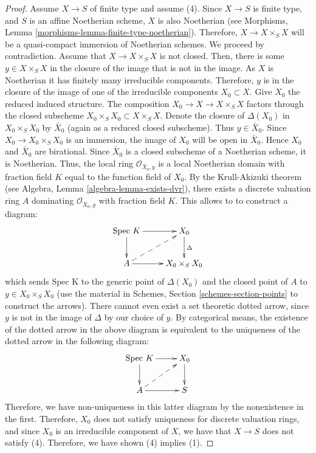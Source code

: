 \begin{proof}
\medskip\noindent
Assume $X \to S$ of finite type and assume (4).
Since $X \to S$ is finite type, and $S$ is an affine Noetherian
scheme, $X$ is also Noetherian (see
Morphisms, Lemma \ref{morphisms-lemma-finite-type-noetherian}).
Therefore, $X \to X \times_S X$ will
be a quasi-compact immersion of Noetherian schemes.  We proceed by
contradiction.  Assume that $X \to X \times_S X$ is not closed.  Then,
there is some $y \in X \times_S X$ in the closure of the image that is
not in the image. As $X$ is Noetherian it has finitely many irreducible
components. Therefore, $y$ is in the closure of the image of one of
the irreducible components $X_0 \subset X$.  Give $X_0$ the reduced
induced structure.  The composition $X_0 \to X \to X \times_S X$
factors through the closed subscheme $X_0 \times_S X_0 \subset X \times_S X$.
Denote the closure of $\Delta(X_0)$ in $X_0 \times_S X_0$
by $\bar X_0$ (again as a reduced closed subscheme). Thus $y \in \bar X_0$.
Since $X_0 \to X_0 \times_S X_0$ is an immersion, the image of $X_0$
will be open in $\bar X_0$. Hence $X_0$ and $\bar X_0$ are
birational. Since $\bar{X}_0$ is a closed subscheme of a
Noetherian scheme, it is Noetherian. Thus, the local ring
$\mathcal O_{{\bar X_0, y}}$ is a local Noetherian domain with fraction
field $K$ equal to the function field of $X_0$.  By the Krull-Akizuki
theorem (see Algebra, Lemma \ref{algebra-lemma-exists-dvr}), there exists a
discrete valuation ring $A$ dominating $\mathcal O_{{\bar X_0, y}}$
with fraction field $K$.  This allows to to construct a diagram:
\begin{equation}
\xymatrix{
\text{Spec }K \ar[r] \ar[d] & X_0 \ar[d]^{\Delta} \\
A \ar[r] \ar@{-->}[ur]& X_0 \times_S X_0 \\
}
\end{equation}
which sends $\text{Spec K}$ to the generic point of $\Delta(X_0)$ and
the closed point of $A$ to $y \in X_0 \times_S X_0$ (use the material in
Schemes, Section \ref{schemes-section-points} to construct the arrows).
There cannot even exist 
a set theoretic dotted arrow, since $y$ is not in the image of
$\Delta$ by our choice of $y$.  By categorical means, the existence of
the dotted arrow in the above diagram is equivalent to the uniqueness
of the dotted arrow in the following diagram:
\begin{equation}
\xymatrix {
\text{Spec } K \ar[r] \ar[d] & X_0 \ar[d]\\
A \ar[r] \ar@{-->}[ur] & S \\
}
\end{equation}
Therefore, we have non-uniqueness in this latter diagram by the
nonexistence in the first.  Therefore, $X_0$ does not satisfy
uniqueness for discrete valuation rings, and since $X_0$ is an
irreducible component of $X$, we have that $X \to S$ does not satisfy
(4).  Therefore, we have shown (4) implies (1).
\end{proof}

